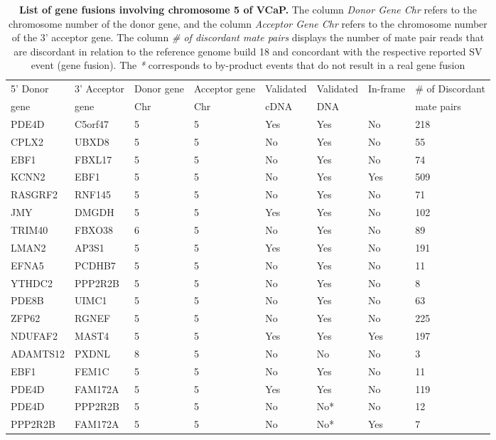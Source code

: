 \begin{table}[t!]
\begin{tabular}{llllllll}
\toprule
5' Donor & 3' Acceptor & Donor gene & Acceptor gene & Validated & Validated & In-frame & \# of Discordant  \\
gene & gene & Chr & Chr & cDNA & DNA & & mate pairs \\
\midrule
PDE4D & C5orf47 & 5 & 5 & Yes & Yes & No & 218 \\
CPLX2 & UBXD8 & 5 & 5 & No & Yes & No & 55 \\
EBF1 & FBXL17 & 5 & 5 & No & Yes & No & 74 \\
KCNN2 & EBF1 & 5 & 5 & No & Yes & Yes & 509 \\
RASGRF2 & RNF145 & 5 & 5 & No & Yes & No & 71 \\
JMY & DMGDH & 5 & 5 & Yes & Yes & No & 102 \\
TRIM40 & FBXO38 & 6 & 5 & No & Yes & No & 89 \\
LMAN2 & AP3S1 & 5 & 5 & Yes & Yes & No & 191 \\
EFNA5 & PCDHB7 & 5 & 5 & No & Yes & No & 11 \\
YTHDC2 & PPP2R2B & 5 & 5 & No & Yes & No & 8 \\
PDE8B & UIMC1 & 5 & 5 & No & Yes & No & 63 \\
ZFP62 & RGNEF & 5 & 5 & No & Yes & No & 225 \\
NDUFAF2 & MAST4 & 5 & 5 & Yes & Yes & Yes & 197 \\
ADAMTS12 & PXDNL & 8 & 5 & No & No & No & 3 \\
EBF1 & FEM1C & 5 & 5 & No & Yes & No & 11 \\
PDE4D & FAM172A & 5 & 5 & Yes & Yes & No & 119 \\
PDE4D & PPP2R2B & 5 & 5 & No & No* & No & 12 \\
PPP2R2B & FAM172A & 5 & 5 & No & No* & Yes & 7 \\
\toprule
\end{tabular}

\caption{\textbf{List of gene fusions involving chromosome 5 of VCaP.} The column \textit{Donor Gene Chr} refers to the chromosome number of the donor gene, and the column \textit{Acceptor Gene Chr} refers to the chromosome number of the 3' acceptor gene. The column \textit{\# of discordant mate pairs} displays the number of mate pair reads that are discordant in relation to the reference genome build 18 and concordant with the respective reported SV event (gene fusion). The \textit{*} corresponds to by-product events that do not result in a real gene fusion}
\label{table:fusions}
\end{table}



